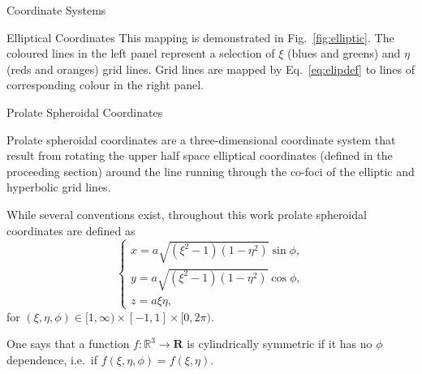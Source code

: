 \documentclass[letterpaper, 11 pt]{report}
\begin{document}
\begin{appendices}
\begin{chapter}{Coordinate Systems \label{chap:coords}}
\begin{section}{Elliptical Coordinates \label{sec:elliptic}}
         This mapping is demonstrated in Fig.~\ref{fig:elliptic}. The coloured lines in the left panel
         represent a selection of $\xi$ (blues and greens) and $\eta$ (reds and oranges) grid lines.
         Grid lines are mapped by Eq.~\eqref{eq:elipdef} to lines of corresponding colour in the right
         panel.

      \end{section}

      \begin{section}{Prolate Spheroidal Coordinates \label{sec:prolate}}

         Prolate spheroidal coordinates are a three-dimensional coordinate system that result from
         rotating the upper half space elliptical coordinates (defined in the proceeding section) around
         the line running through the co-foci of the elliptic and hyperbolic grid lines.

         While several conventions exist, throughout this work prolate spheroidal coordinates are
         defined as
         \begin{equation} \label{eq:psc}
            \left\{
            \begin{array}{l}
               x = a \sqrt{(\xi^2 - 1)(1 - \eta^2)} \sin \phi, \\
               y = a \sqrt{(\xi^2 - 1)(1 - \eta^2)} \cos \phi, \\
               z = a \xi \eta,
            \end{array}
            \right.
         \end{equation}
         for $(\xi, \eta, \phi) \in [1, \infty) \times [-1,1] \times [0,2\pi)$.

         One says that a function $f: \mathbb{R}^3 \rightarrow \mathbf{R}$ is cylindrically symmetric if
         it has no $\phi$ dependence, i.e.\ if $f(\xi,\eta,\phi) = f(\xi,\eta)$.

      \end{section}

   \end{chapter}

\end{appendices}

\cleardoublepage
{}
{}

\singlespacing

\printbibliography[title=References] %
\end{document}
